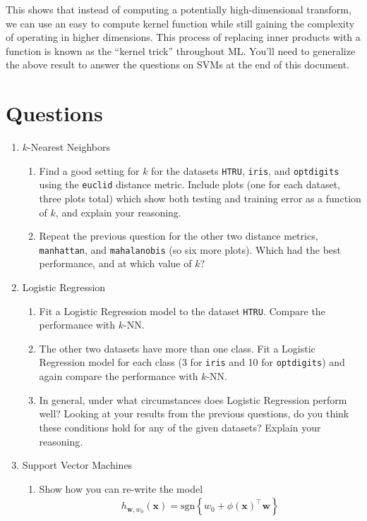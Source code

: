 \documentclass{article}
\begin{document}
This shows that instead of computing a potentially high-dimensional transform, we can use an easy to compute kernel function while still gaining the complexity of operating in higher dimensions. This process of replacing inner products with a function is known as the ``kernel trick'' throughout ML.  You'll need to generalize the above result to answer the questions on SVMs at the end of this document.

\section*{Questions}
\begin{enumerate}
	\item \(k\)-Nearest Neighbors
	\begin{enumerate}
		\item Find a good setting for \(k\) for the datasets \texttt{HTRU}, \texttt{iris}, and \texttt{optdigits} using the \texttt{euclid} distance metric. Include plots (one for each dataset, three plots total) which show both testing and training error as a function of \(k\), and explain your reasoning.
		\item Repeat the previous question for the other two distance metrics, \texttt{manhattan}, and \texttt{mahalanobis}
		(so six more plots). Which had the best performance, and at which value of \(k\)? 
	\end{enumerate}
	\item Logistic Regression
	\begin{enumerate}
		\item Fit a Logistic Regression model to the dataset \texttt{HTRU}. Compare the performance with \(k\)-NN.
		\item The other two datasets have more than one class. Fit a Logistic Regression model for each class (3 for \texttt{iris} and 10 for \texttt{optdigits}) and again compare the performance with \(k\)-NN.
		\item In general, under what circumstances does Logistic Regression perform well? Looking at your results from the previous questions, do you think these conditions hold for any of the given datasets? Explain your reasoning.
	\end{enumerate}
	\item Support Vector Machines
	\begin{enumerate}
		\item Show how you can re-write the model
		\begin{align*}
			h_{\mathbf{w},w_0}(\mathbf{x}) = \text{sgn}\left\{ w_0 + \phi(\mathbf{x})^\top \mathbf{w} \right\}

\end{align*}
\end{enumerate}
\end{enumerate}
\end{document}
